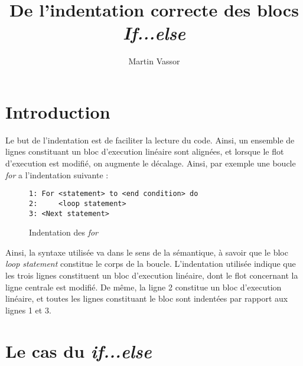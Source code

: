 \documentclass{article}
\author{Martin Vassor}
\title{De l'indentation correcte des blocs \emph{If...else}}
\begin{document}
\maketitle
{}


\section{Introduction}
Le but de l'indentation est de faciliter la lecture du code. Ainsi, un ensemble de lignes constituant un bloc d'execution linéaire sont alignées, et lorsque le flot d'execution est modifié, on augmente le décalage. Ainsi, par exemple une boucle \emph{for} a l'indentation suivante : 

\begin{figure}
\begin{framed}
\begin{verbatim}
1: For <statement> to <end condition> do
2:     <loop statement>
3: <Next statement>
\end{verbatim}
\end{framed}
\caption{Indentation des \emph{for}}
\end{figure}

Ainsi, la syntaxe utilisée va dans le sens de la sémantique, à savoir que le bloc \emph{loop statement} constitue le corps de la boucle. L'indentation utilisée indique que les trois lignes constituent un bloc d'execution linéaire, dont le flot concernant la ligne centrale est modifié. De même, la ligne 2 constitue un bloc d'execution linéaire, et toutes les lignes constituant le bloc sont indentées par rapport aux lignes 1 et 3.

\section{Le cas du \emph{if...else}}
\end{document}
